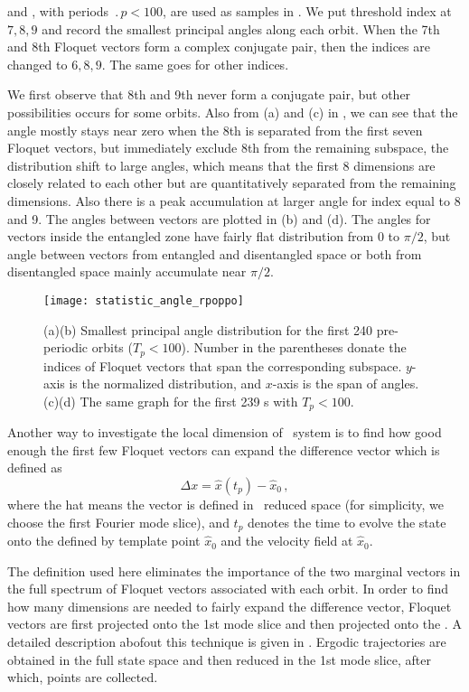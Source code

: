\begin{description}
 and , with periods $\period{p} < 100$, are used as samples in
 . We put threshold index at $7, 8, 9$
and record the smallest principal angles along each orbit. When the 7th and
8th Floquet vectors form a complex conjugate pair, then the indices are
changed to $6, 8, 9$. The same goes for other indices.

We first observe
that 8th and 9th never form a conjugate pair, but other possibilities
occurs for some orbits. Also from (a) and (c) in
 , we can see that
the angle mostly stays near zero when the 8th is separated
from the first seven Floquet vectors, but immediately exclude 8th from the
remaining subspace, the distribution shift to large angles, which means
that the first 8 dimensions are closely related to each other but are
quantitatively separated from the remaining dimensions. Also there is
a peak accumulation at larger angle for index equal to 8 and 9.
The angles between vectors are plotted in (b) and (d). The
angles for vectors inside the entangled zone have fairly flat distribution
from 0 to $\pi/2$, but angle between vectors from entangled and
disentangled space or both from disentangled space mainly accumulate
near $\pi/2$.

\begin{figure}[h]
  \centering
  \texttt{[image: statistic\_angle\_rpoppo]}
  \caption{
    (a)(b) Smallest principal angle distribution for the first
    240 pre-periodic
    orbits ($T_p < 100$). Number in the parentheses donate the indices
    of Floquet vectors that span the corresponding subspace. $y$-axis
    is the normalized distribution, and $x$-axis is the span of angles.
    (c)(d) The same graph for the first 239 \rpo s with
    $T_p < 100$.
  }
  \label{fig:statistic_angle_rpoppo}
\end{figure}


Another way to investigate the local dimension of \KS\ system is to
find how good enough the first few Floquet vectors can expand the
difference vector which is defined as
\[
\Delta x = \hat{x}(t_p) -\hat{x}_0
\,,
\]
where the hat means the vector is defined in \ reduced space
(for simplicity, we choose the first Fourier mode slice), and $t_p$
denotes the time to evolve the state onto the {\PoincSec} defined by
template point $\hat{x}_0$ and the velocity field at $\hat{x}_0$.

The definition used here eliminates the importance of the two marginal
vectors in the full spectrum of Floquet vectors associated with each
orbit. In order to find how many dimensions are needed to fairly expand
the difference vector, Floquet vectors are first projected onto the 1st
mode slice and then projected onto the {\PoincSec}. A detailed
description abofout this technique is given in .
Ergodic trajectories are obtained in the full state space and then
reduced in the 1st mode slice, after which, {\PoincSec} points are
collected.


\end{description}
